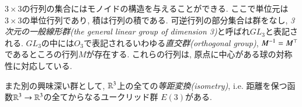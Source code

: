 \begin{example}\label{ex:important groups}


$3\times 3$の行列の集合にはモノイドの構造を与えることができる. ここで単位元は$3\times 3$の単位行列であり, 積は行列の積である. 可逆行列の部分集合は群をなし, \emph{3次元の一般線形群(the general linear group of dimension 3)}と呼ばれ$GL_3$と表記される. $GL_3$の中には$O_3$で表記されるいわゆる\emph{直交群(orthogonal group)}, $M^\m1=M^\top$であるところの行列$M$が存在する. これらの行列は, 原点に中心がある球の対称性に対応している.


また別の興味深い群として, ${\mathbb R}^3$上の全ての\emph{等距変換(isometry)}, i.e. 距離を保つ函数${\mathbb R}^3\rightarrow{\mathbb R}^3$の全てからなるユークリッド群 $E(3)$がある.

\end{example}

